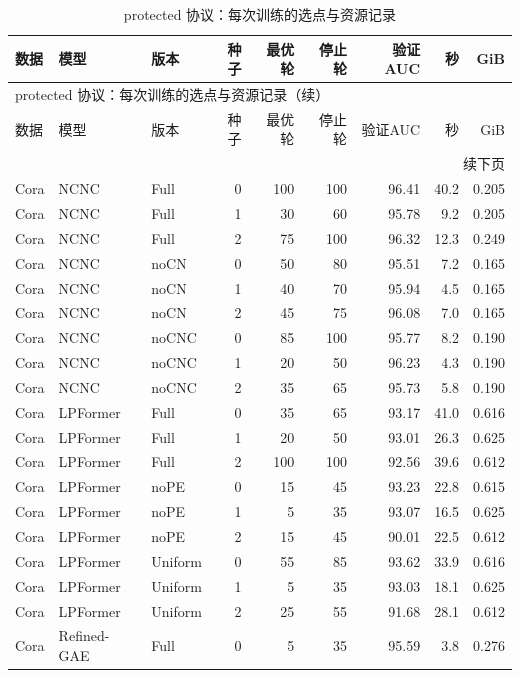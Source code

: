 {\footnotesize
\setlength{\tabcolsep}{3.2pt}
\renewcommand{\arraystretch}{1.10}
\begin{longtable}{lllrrrrrr}
\caption{protected 协议：每次训练的选点与资源记录}\\
\toprule
数据 & 模型 & 版本 & 种子 & 最优轮 & 停止轮 & 验证AUC & 秒 & GiB \\
\midrule
\endfirsthead
\multicolumn{9}{l}{protected 协议：每次训练的选点与资源记录（续）}\\
\toprule
数据 & 模型 & 版本 & 种子 & 最优轮 & 停止轮 & 验证AUC & 秒 & GiB \\
\midrule
\endhead
\midrule\multicolumn{9}{r}{续下页}\\
\endfoot
\bottomrule
\endlastfoot
Cora & NCNC & Full & 0 & 100 & 100 & 96.41 & 40.2 & 0.205 \\
Cora & NCNC & Full & 1 & 30 & 60 & 95.78 & 9.2 & 0.205 \\
Cora & NCNC & Full & 2 & 75 & 100 & 96.32 & 12.3 & 0.249 \\
Cora & NCNC & noCN & 0 & 50 & 80 & 95.51 & 7.2 & 0.165 \\
Cora & NCNC & noCN & 1 & 40 & 70 & 95.94 & 4.5 & 0.165 \\
Cora & NCNC & noCN & 2 & 45 & 75 & 96.08 & 7.0 & 0.165 \\
Cora & NCNC & noCNC & 0 & 85 & 100 & 95.77 & 8.2 & 0.190 \\
Cora & NCNC & noCNC & 1 & 20 & 50 & 96.23 & 4.3 & 0.190 \\
Cora & NCNC & noCNC & 2 & 35 & 65 & 95.73 & 5.8 & 0.190 \\
Cora & LPFormer & Full & 0 & 35 & 65 & 93.17 & 41.0 & 0.616 \\
Cora & LPFormer & Full & 1 & 20 & 50 & 93.01 & 26.3 & 0.625 \\
Cora & LPFormer & Full & 2 & 100 & 100 & 92.56 & 39.6 & 0.612 \\
Cora & LPFormer & noPE & 0 & 15 & 45 & 93.23 & 22.8 & 0.615 \\
Cora & LPFormer & noPE & 1 & 5 & 35 & 93.07 & 16.5 & 0.625 \\
Cora & LPFormer & noPE & 2 & 15 & 45 & 90.01 & 22.5 & 0.612 \\
Cora & LPFormer & Uniform & 0 & 55 & 85 & 93.62 & 33.9 & 0.616 \\
Cora & LPFormer & Uniform & 1 & 5 & 35 & 93.03 & 18.1 & 0.625 \\
Cora & LPFormer & Uniform & 2 & 25 & 55 & 91.68 & 28.1 & 0.612 \\
Cora & Refined-GAE & Full & 0 & 5 & 35 & 95.59 & 3.8 & 0.276 \\

\end{longtable}}
